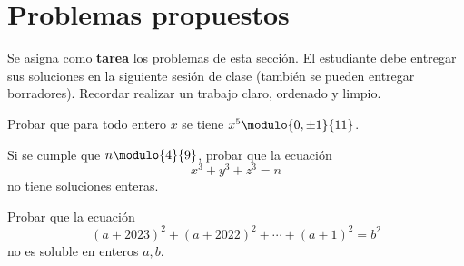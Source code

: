 \section{Problemas propuestos}

Se asigna como \textbf{tarea} los problemas de esta sección.
El estudiante debe entregar sus soluciones en la siguiente sesión de clase (también se pueden entregar borradores).
Recordar realizar un trabajo claro, ordenado y limpio.

\begin{exercise}
    Probar que para todo entero $x$ se tiene $x^5 \modulo{0,\pm 1}{11}$.
\end{exercise}

\begin{problem}
    Si se cumple que $n \modulo{4}{9}$, probar que la ecuación
    \[
        x^3 + y^3 + z^3 = n
    \]
    no tiene soluciones enteras.
\end{problem}

\begin{problem}
    Probar que la ecuación
    \[
        (a + 2023)^2 + (a + 2022)^2 + \cdots + (a + 1)^2 = b^2
    \]
    no es soluble en enteros $a,b$.
\end{problem}
